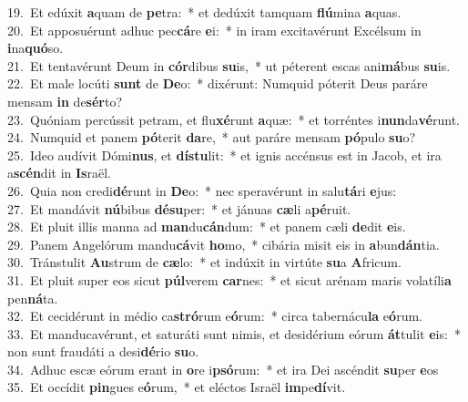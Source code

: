 {19.~}Et edúxit \textbf{a}quam de \textbf{pe}tra:~* et dedúxit tamquam \textbf{flú}mina \textbf{a}quas.\\
{20.~}Et apposuérunt adhuc pec\textbf{cá}re \textbf{e}i:~* in iram excitavérunt Excélsum in \textbf{i}na\textbf{quó}so.\\
{21.~}Et tentavérunt Deum in \textbf{cór}dibus \textbf{su}is,~* ut péterent escas ani\textbf{má}bus \textbf{su}is.\\
{22.~}Et male locúti \textbf{sunt} de \textbf{De}o:~* dixérunt: Numquid póterit Deus paráre mensam \textbf{in} de\textbf{sér}to?\\
{23.~}Quóniam percússit petram, et flu\textbf{xé}runt \textbf{a}quæ:~* et torréntes i\textbf{nun}da\textbf{vé}runt.\\
{24.~}Numquid et panem \textbf{pó}terit \textbf{da}re,~* aut paráre mensam \textbf{pó}pulo \textbf{su}o?\\
{25.~}Ideo audívit Dómi\textbf{nus}, et \textbf{dí}\textbf{stu}lit:~* et ignis accénsus est in Jacob, et ira a\textbf{scén}dit in \textbf{Is}raël.\\
{26.~}Quia non credi\textbf{dé}runt in \textbf{De}o:~* nec speravérunt in salu\textbf{tá}ri \textbf{e}jus:\\
{27.~}Et mandávit \textbf{nú}bibus \textbf{dé}\textbf{su}per:~* et jánuas \textbf{cæ}li a\textbf{pé}ruit.\\
{28.~}Et pluit illis manna ad \textbf{man}du\textbf{cán}dum:~* et panem cæli \textbf{de}dit \textbf{e}is.\\
{29.~}Panem Angelórum mandu\textbf{cá}vit \textbf{ho}mo,~* cibária misit eis in \textbf{a}bun\textbf{dán}tia.\\
{30.~}Tránstulit \textbf{Au}strum de \textbf{cæ}lo:~* et indúxit in virtúte \textbf{su}a \textbf{A}fricum.\\
{31.~}Et pluit super eos sicut \textbf{púl}verem \textbf{car}nes:~* et sicut arénam maris volatíli\textbf{a} pen\textbf{ná}ta.\\
{32.~}Et cecidérunt in médio ca\textbf{stró}rum e\textbf{ó}rum:~* circa tabernácu\textbf{la} e\textbf{ó}rum.\\
{33.~}Et manducavérunt, et saturáti sunt nimis, et desidérium eórum \textbf{át}tulit \textbf{e}is:~* non sunt fraudáti a desi\textbf{dé}rio \textbf{su}o.\\
{34.~}Adhuc escæ eórum erant in \textbf{o}re i\textbf{psó}rum:~* et ira Dei ascéndit \textbf{su}per \textbf{e}os\\
{35.~}Et occídit \textbf{pin}gues e\textbf{ó}rum,~* et eléctos Israël \textbf{im}pe\textbf{dí}vit.\\
